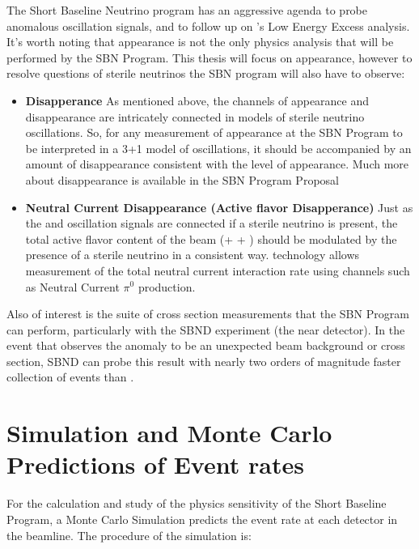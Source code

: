 The Short Baseline Neutrino program has an aggressive agenda to probe anomalous oscillation signals, and to follow up on \uboone's Low Energy Excess analysis.  It's worth noting that \nue appearance is not the only physics analysis that will be performed by the SBN Program.  This thesis will focus on \nue appearance, however to resolve questions of sterile neutrinos the SBN program will also have to observe:

\begin{itemize}

\item {\bf \numu Disapperance}  As mentioned above, the channels of \nue appearance and \numu disappearance are intricately connected in models of sterile neutrino oscillations.  So, for any measurement of \nue appearance at the SBN Program to be interpreted in a 3+1 model of oscillations, it should be accompanied by an amount of \numu disappearance consistent with the level of \nue appearance.  Much more about \numu disappearance is available in the SBN Program Proposal \cite{Antonello:2015lea} 

\item {\bf Neutral Current Disappearance (Active flavor Disapperance)}  Just as the \nue and \numu oscillation signals are connected if a sterile neutrino is present, the total active flavor content of the beam (\nue + \numu + \nutau) should be modulated by the presence of a sterile neutrino in a consistent way.  \lartpc technology allows measurement of the total neutral current interaction rate using channels such as Neutral Current $\pi^0$ production.

\end{itemize}

Also of interest is the suite of cross section measurements that the SBN Program can perform, particularly with the SBND experiment (the near detector).  In the event that \uboone observes the \MB anomaly to be an unexpected beam background or cross section, SBND can probe this result with nearly two orders of magnitude faster collection of events than \uboone.

\section{Simulation and Monte Carlo Predictions of Event rates}

For the calculation and study of the physics sensitivity of the Short Baseline Program, a Monte Carlo Simulation predicts the event rate at each detector in the beamline.  The procedure of the simulation is:

